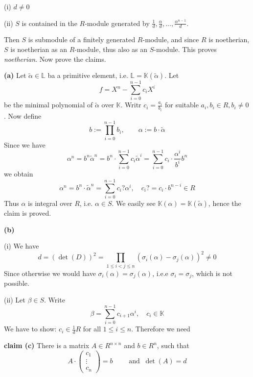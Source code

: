 \documentclass[12pt]{book}
\begin{document}
\begin{spacing}{1.3}
\begin{compactenum}
\begin{compactenum}
\item[(i)] $d \neq 0$
\item[(ii)] $S$ is contained in the $R$-module generated by $\frac{1}{d}, \frac{\alpha}{d}, \ldots, \frac{\alpha^{n-1}}{d}$.
\end{compactenum}
\end{compactenum}
Then $S$ is submodule of a finitely generated $R$-module, and since $R$ is noetherian, $S$ is noetherian as an $R$-module, thus also as an $S$-module. This proves \textit{noetherian}. Now prove the claims.
\begin{compactenum}
\item[\textbf{(a)}] Let $\tilde{\alpha} \in \mathbb{L}$ ba a primitive element, i.e. $\mathbb{L}=\mathbb{K}(\tilde{\alpha})$. Let 
$$f = X^n- \sum_{i=0}^{n-1} c_i X^{i}$$
be the minimal polynomial of $\tilde{\alpha}$ over $\mathbb{K}$. Writr $c_i = \frac{a_i}{b_i}$ for suitable $a_i, b_i \in R, b_i \neq 0$. Now define
$$b:= \prod_{i=0}^{n-1} b_i, \qquad \alpha:= b \cdot \tilde{\alpha}$$
Since we have
$$\alpha^n=b^n \tilde{\alpha}^n=b^n \cdot \sum_{i=0}^{n-1} c_i \tilde{\alpha}^{i} =\sum_{i=0}^{n-1} c_i \cdot \frac{\alpha^{i}}{b^{i}} b^n$$
we obtain
$$\alpha^n = b^n \cdot \tilde{\alpha}^n = \sum_{i=0}^{n-1}c_i? \alpha^{i}, \quad c_i?=c_i \cdot b^{n-i} \in R$$
Thus $\alpha$ is integral over $R$, i.e. $\alpha \in S$. We easily see $\mathbb{K}(\alpha)=\mathbb{K}(\tilde{\alpha})$, hence the claim is proved.
\item[\textbf{(b)}] \begin{compactenum}
\item[(i)] We have
$$d= \left(\det(D)\right)^2 = \prod_{1 \leqslant i < j \leqslant n} \left(\sigma_i(\alpha)-\sigma_j(\alpha)\right)^2 \neq 0$$
Since otherwise we would have $\sigma_i(\alpha)=\sigma_j(\alpha)$, i.e.e $\sigma_i = \sigma_j$, which is not possible.
\item[(ii)] Let $\beta \in S$. Write 
$$\beta=\sum_{i=0}^{n-1} c_{i+1}\alpha^{i}, \quad c_i \in \mathbb{K}$$
We have to show: $c_i \in \frac{1}{d} R$ for all $1 \leqslant i \leqslant n$. Therefore we need
\begin{compactenum}
\item[\textbf{claim (c)}] There is a matrix $A \in R^{n \times n}$ and $b \in R^n$, such that
$$A \cdot \begin{pmatrix} c_1 \\ \vdots \\ c_n \end{pmatrix} = b \qquad \textrm{ and } \ \det(A)=d$$
\end{compactenum} 

\end{compactenum}
\end{compactenum}
\end{spacing}
\end{document}
